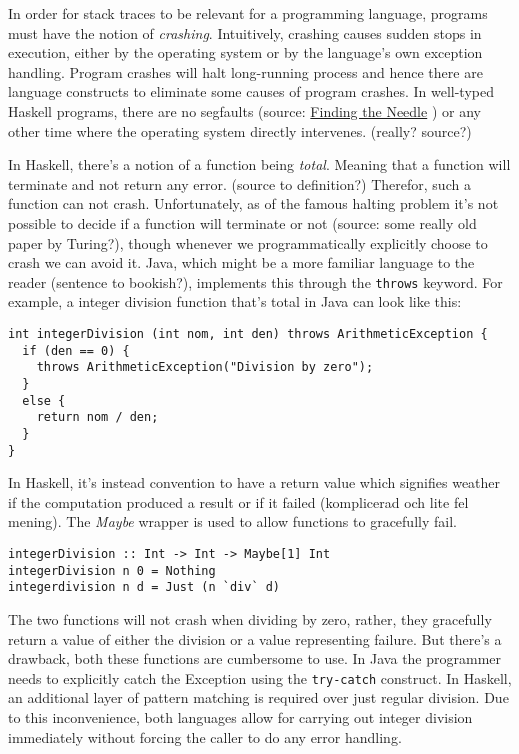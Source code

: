 In order for stack traces to be relevant for a programming language, programs
must have the notion of \emph{crashing}. Intuitively, crashing causes sudden
stops in execution, either by the operating system or by the language's own
exception handling. Program crashes will halt long-running process and hence
there are language constructs to eliminate some causes of program crashes.
In well-typed Haskell programs, there are no segfaults (source:
\href{http://research.microsoft.com/~simonpj/papers/stack-trace/DebugTraces.pdf}{Finding the Needle}
) or any other time where the operating system directly intervenes. (really? source?)

In Haskell, there's a notion of a function being \emph{total}. Meaning that a
function will terminate and not return any error. (source to definition?)
Therefor, such a function can not crash. Unfortunately, as of the famous
halting problem it's not possible to decide if a function will terminate or not
(source: some really old paper by Turing?), though whenever we programmatically
explicitly choose to crash we can avoid it. Java, which might be a more
familiar language to the reader (sentence to bookish?), implements this through the
\texttt{throws} keyword. For example, a integer division function that's total in
Java can look like this:

\begin{verbatim}
int integerDivision (int nom, int den) throws ArithmeticException {
  if (den == 0) {
    throws ArithmeticException("Division by zero");
  }
  else {
    return nom / den;
  }
}
\end{verbatim}

In Haskell, it's instead convention to have a return value which signifies
weather if the computation produced a result or if it failed (komplicerad och lite fel mening).
The \emph{Maybe}
wrapper is used to allow functions to gracefully fail.



\begin{verbatim}
integerDivision :: Int -> Int -> Maybe[1] Int
integerDivision n 0 = Nothing
integerdivision n d = Just (n `div` d)
\end{verbatim}

The two functions will not crash when dividing by zero,
rather, they gracefully return a value of either the division or a
value representing failure. But there's a drawback, both
these functions are cumbersome to use. In Java the programmer needs to
explicitly catch the Exception using the \texttt{try-catch} construct.
In Haskell, an additional layer of pattern matching is required over
just regular division. Due to this inconvenience, both languages allow
for carrying out integer division immediately without forcing the caller
to do any error handling.

